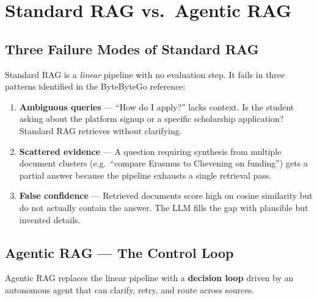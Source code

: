 \documentclass[11pt,a4paper]{article}
\begin{document}
\section{Standard RAG vs.\ Agentic RAG}

\subsection{Three Failure Modes of Standard RAG}

Standard RAG is a \emph{linear} pipeline with no evaluation step. It fails in
three patterns identified in the ByteByteGo reference:

\begin{enumerate}
  \item \textbf{Ambiguous queries} --- ``How do I apply?'' lacks context. Is the student
    asking about the platform signup or a specific scholarship application? Standard RAG
    retrieves without clarifying.
  \item \textbf{Scattered evidence} --- A question requiring synthesis from multiple
    document clusters (e.g.\ ``compare Erasmus to Chevening on funding'') gets a partial
    answer because the pipeline exhausts a single retrieval pass.
  \item \textbf{False confidence} --- Retrieved documents score high on cosine similarity
    but do not actually contain the answer. The LLM fills the gap with plausible but
    invented details.
\end{enumerate}

\subsection{Agentic RAG --- The Control Loop}

Agentic RAG replaces the linear pipeline with a \textbf{decision loop} driven
by an autonomous agent that can clarify, retry, and route across sources.
\end{document}
